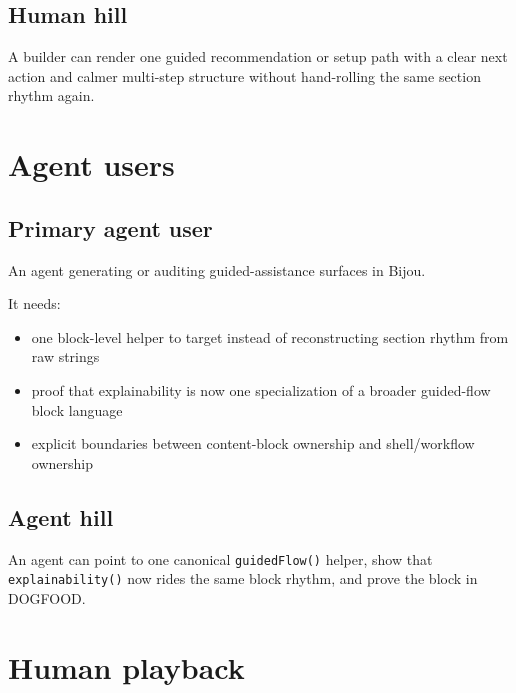 \subsection{Human hill}\label{record-175-human-hill}

A builder can render one guided recommendation or setup path with a clear next action and calmer multi-step structure without hand-rolling the same section rhythm again.

\section{Agent users}\label{record-175-agent-users}

\subsection{Primary agent user}\label{record-175-primary-agent-user}

An agent generating or auditing guided-assistance surfaces in Bijou.

It needs:

\begin{itemize}
\tightlist
\item
  one block-level helper to target instead of reconstructing section rhythm from raw strings
\item
  proof that explainability is now one specialization of a broader guided-flow block language
\item
  explicit boundaries between content-block ownership and shell/workflow ownership
\end{itemize}

\subsection{Agent hill}\label{record-175-agent-hill}

An agent can point to one canonical \texttt{g\allowbreak{}u\allowbreak{}i\allowbreak{}d\allowbreak{}e\allowbreak{}d\allowbreak{}F\allowbreak{}l\allowbreak{}o\allowbreak{}w\allowbreak{}(\allowbreak{})} helper, show that \texttt{e\allowbreak{}x\allowbreak{}p\allowbreak{}l\allowbreak{}a\allowbreak{}i\allowbreak{}n\allowbreak{}a\allowbreak{}b\allowbreak{}i\allowbreak{}l\allowbreak{}i\allowbreak{}t\allowbreak{}y\allowbreak{}(\allowbreak{})} now rides the same block rhythm, and prove the block in DOGFOOD.

\section{Human playback}\label{record-175-human-playback}

